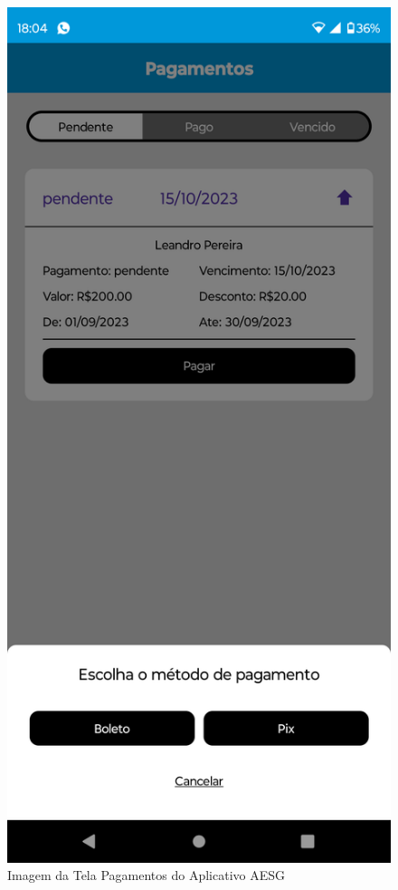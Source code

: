 \documentclass[
    12pt,                   %
    openright,              %
    oneside,                %
    a4paper,                %
    sumario=tradicional,    %
    english,                %
    brazil,                 %
    ]{abntex2}
\begin{document}
\begin{figure}[!h]
\begin{minipage}{0.5\textwidth}
                \end{minipage}%
                \begin{minipage}{0.5\textwidth}
                    \centering
                    \includegraphics[width=0.8\linewidth]{Imagens/App Images User/AUPagamento2.png}
                    \caption[Imagem da Tela Pagamentos do Aplicativo AESG]{ 
                    Imagem da Tela Pagamentos do Aplicativo AESG}
                    \label{fig:AppTelaPagamentos2}
                \end{minipage}
            \end{figure}
    
\end{document}
